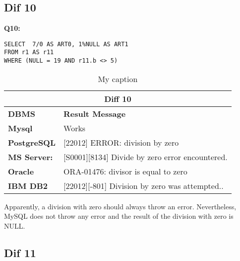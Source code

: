 \subsection{Dif 10}
  
\begin{mdframed}[backgroundcolor=gray!20] 
\textbf{Q10:}
\begin{lstlisting}
SELECT  7/0 AS ART0, 1%NULL AS ART1
FROM r1 AS r11
WHERE (NULL = 19 AND r11.b <> 5)   
\end{lstlisting}
\end{mdframed}
 
 
\begin{table}[h]
\centering
\caption{My caption}
\label{my-label}
\begin{tabular}{|p{2cm}|p{12cm}|}
\hline
\multicolumn{2}{|c|}{\textbf{Diff 10}}                                                                                       \\ \hline
\textbf{DBMS}                              & \textbf{Result Message}                                                        \\ \hline
{\color[HTML]{333333} \textbf{Mysql}}      & {\color[HTML]{333333} Works}                                                   \\ \hline
{\color[HTML]{333333} \textbf{PostgreSQL}} & {\color[HTML]{333333} {[}22012{]} ERROR: division by zero}                     \\ \hline
{\color[HTML]{333333} \textbf{MS Server:}} & {\color[HTML]{333333} {[}S0001{]}{[}8134{]} Divide by zero error encountered.} \\ \hline
\textbf{Oracle}                            & ORA-01476: divisor is equal to zero                                            \\ \hline
\textbf{IBM DB2}                           & {[}22012{]}{[}-801{]} Division by zero was attempted..                         \\ \hline
\end{tabular}
\end{table} 

Apparently, a division with zero should always throw an error. Nevertheless, MySQL does not throw any error and the result of the division with zero is NULL. 


\subsection{Dif 11}
  
